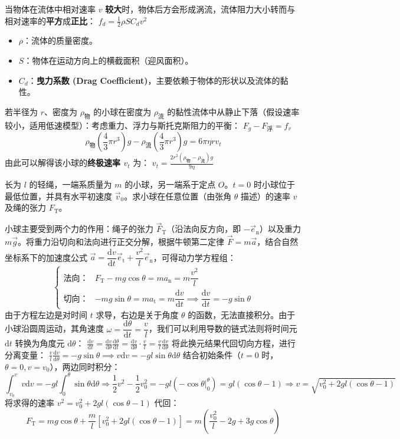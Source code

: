 当物体在流体中相对速率 $v$ \textbf{较大}时，物体后方会形成涡流，流体阻力大小转而与相对速率的\textbf{平方}成\textbf{正比}：
 \(f_d = \frac{1}{2} \rho S C_d v^2\) 
\begin{itemize}
 \item $\rho$：流体的质量密度。
 \item $S$：物体在运动方向上的横截面积（迎风面积）。
 \item $C_d$：\textbf{曳力系数 (Drag Coefficient)}，主要依赖于物体的形状以及流体的黏性。
\end{itemize}
若半径为 $r$、密度为 $\rho_{\text{物}}$ 的小球在密度为 $\rho_{\text{流}}$ 的黏性流体中从静止下落（假设速率较小，适用低速模型）：考虑重力、浮力与斯托克斯阻力的平衡：
 \(F_g - F_{\text{浮}} = f_v\) 
\[
\rho_{\text{物}} \left(\frac{4}{3}\pi r^3\right)g - \rho_{\text{流}} \left(\frac{4}{3}\pi r^3\right)g = 6\pi \eta r v_t
\]
由此可以解得该小球的\textbf{终极速率 $v_t$} 为：
 \(v_t = \frac{2r^2(\rho_{\text{物}} - \rho_{\text{流}})g}{9\eta}\) 

\begin{exercise}
长为 $l$ 的轻绳，一端系质量为 $m$ 的小球，另一端系于定点 $O$。$t = 0$ 时小球位于最低位置，并具有水平初速度 $\vec{v}_0$。求小球在任意位置（由张角 $\theta$ 描述）的速率 $v$ 及绳的张力 $F_{\text{T}}$。
\end{exercise}
\begin{solution}
小球主要受到两个力的作用：绳子的张力 $\vec{F}_{\text{T}}$（沿法向反方向，即 $-\vec{e}_{\text{n}}$）以及重力 $m\vec{g}$。将重力沿切向和法向进行正交分解，根据牛顿第二定律 $\vec{F} = m\vec{a}$，结合自然坐标系下的加速度公式 $\vec{a} = \dfrac{\mathrm{d}v}{\mathrm{d}t}\vec{e}_{\text{t}} + \dfrac{v^2}{l}\vec{e}_{\text{n}}$，可得动力学方程组：
$$\begin{cases}
\text{法向：} & F_{\text{T}} - mg\cos\theta = ma_{\text{n}} = m \dfrac{v^2}{l} \\
\text{切向：} & -mg\sin\theta = ma_{\text{t}} = m \dfrac{\mathrm{d}v}{\mathrm{d}t}\implies\dfrac{\mathrm{d}v}{\mathrm{d}t} = -g\sin\theta
\end{cases}$$
由于方程左边是对时间 $t$ 求导，右边是关于角度 $\theta$ 的函数，无法直接积分。由于小球沿圆周运动，其角速度 $\omega = \dfrac{\mathrm{d}\theta}{\mathrm{d}t} = \dfrac{v}{l}$，我们可以利用导数的链式法则将时间元 $\mathrm{d}t$ 转换为角度元 $\mathrm{d}\theta$： \(\frac{\mathrm{d}v}{\mathrm{d}t} = \frac{\mathrm{d}v}{\mathrm{d}\theta} \frac{\mathrm{d}\theta}{\mathrm{d}t} = \frac{\mathrm{d}v}{\mathrm{d}\theta} \cdot \frac{v}{l} = \frac{v}{l}\frac{\mathrm{d}v}{\mathrm{d}\theta}\) 
将此换元结果代回切向方程，进行分离变量：
 \(\frac{v}{l}\frac{\mathrm{d}v}{\mathrm{d}\theta} = -g\sin\theta \implies v\mathrm{d}v = -gl\sin\theta\mathrm{d}\theta\) 结合初始条件（$t=0$ 时，$\theta = 0, v = v_0$），两边同时积分：$$\int_{v_0}^{v} v\mathrm{d}v = -gl\int_{0}^{\theta} \sin\theta\mathrm{d}\theta\Rightarrow\frac{1}{2}v^2 - \frac{1}{2}v_0^2 = -gl \left( -\cos\theta \Big|_0^\theta \right) = gl(\cos\theta - 1)\Rightarrow v = \sqrt{v_0^2 + 2gl(\cos\theta - 1)}$$
将求得的速率 $v^2 = v_0^2 + 2gl(\cos\theta - 1)$ 代回：$$F_{\text{T}} = mg\cos\theta + \frac{m}{l}\left[ v_0^2 + 2gl(\cos\theta - 1) \right]= m\left( \frac{v_0^2}{l} - 2g + 3g\cos\theta \right)$$
\end{solution}

